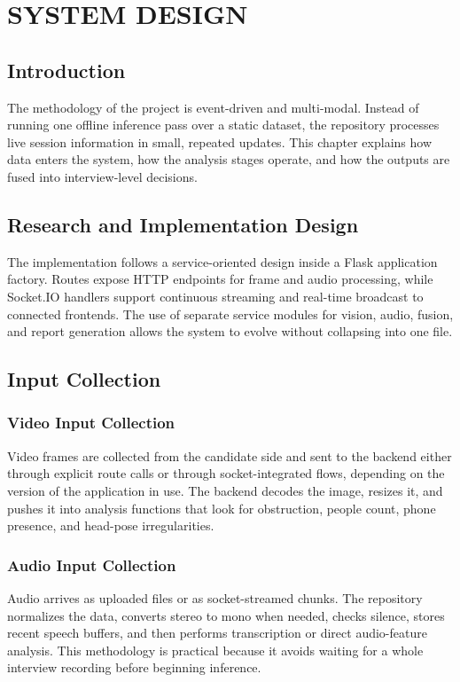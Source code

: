 \documentclass[12pt,a4paper]{extreport}
\begin{document}
\chapter{SYSTEM DESIGN}
\section{Introduction}
The methodology of the project is event-driven and multi-modal. Instead of running one offline inference pass over a static dataset, the repository processes live session information in small, repeated updates. This chapter explains how data enters the system, how the analysis stages operate, and how the outputs are fused into interview-level decisions.

\section{Research and Implementation Design}
The implementation follows a service-oriented design inside a Flask application factory. Routes expose HTTP endpoints for frame and audio processing, while Socket.IO handlers support continuous streaming and real-time broadcast to connected frontends. The use of separate service modules for vision, audio, fusion, and report generation allows the system to evolve without collapsing into one file.

\section{Input Collection}
\subsection{Video Input Collection}
Video frames are collected from the candidate side and sent to the backend either through explicit route calls or through socket-integrated flows, depending on the version of the application in use. The backend decodes the image, resizes it, and pushes it into analysis functions that look for obstruction, people count, phone presence, and head-pose irregularities.

\subsection{Audio Input Collection}
Audio arrives as uploaded files or as socket-streamed chunks. The repository normalizes the data, converts stereo to mono when needed, checks silence, stores recent speech buffers, and then performs transcription or direct audio-feature analysis. This methodology is practical because it avoids waiting for a whole interview recording before beginning inference.
\end{document}

